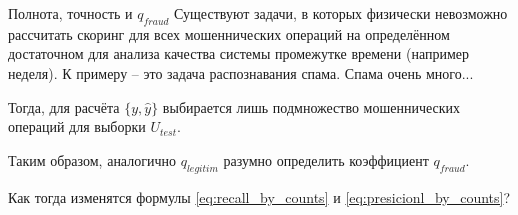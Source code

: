 \documentclass{beamer}
\begin{document}
  	\begin{frame}{Полнота, точность и $q_{fraud}$}
  		Существуют задачи, в которых физически невозможно рассчитать скоринг для всех 
  		мошеннических операций на определённом достаточном для анализа качества системы промежутке времени (например неделя).
  		К примеру -- это задача распознавания спама. Спама очень много...
  		
  		Тогда, для расчёта $\{y, \hat y\}$ выбирается лишь подмножество мошеннических операций для выборки $U_{test}$.
  		
  		Таким образом, аналогично $q_{legitim}$ разумно определить коэффициент $q_{fraud}$.
  		
  		Как тогда изменятся формулы \eqref{eq:recall_by_counts} и \eqref{eq:presicionl_by_counts}?
  	\end{frame}
\end{document}
